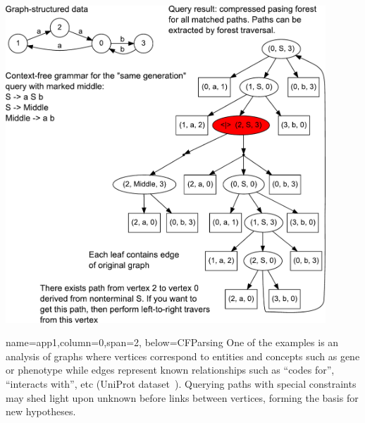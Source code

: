 \documentclass[a0paper,portrait]{baposter}
\begin{document}
\begin{poster}
{\begin{center}
\includegraphics[width=0.9\textwidth]{AnBn_r.pdf}
\end{center}
}

{name=app1,column=0,span=2, below=CFParsing}
{ %
One of the examples is an analysis of graphs where vertices correspond to entities and concepts such as gene or phenotype while edges represent known relationships such as ``codes for'', ``interacts with'', etc (UniProt dataset~\cite{UniProt}).
Querying paths with special constraints may shed light upon unknown before links between vertices, forming the basis for new hypotheses.
}



\end{poster}
\end{document}
